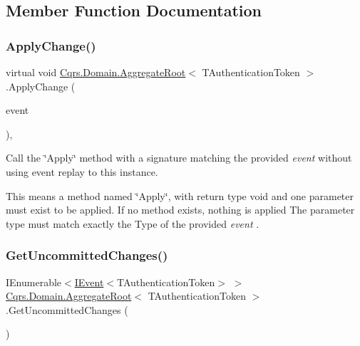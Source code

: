 \subsection{Member Function Documentation}
\mbox{\label{classCqrs_1_1Domain_1_1AggregateRoot_a7e299b13c7556731e52670aa6d782296_a7e299b13c7556731e52670aa6d782296}} 
\subsubsection{\texorpdfstring{Apply\+Change()}{ApplyChange()}}
{\footnotesize\ttfamily virtual void \hyperlink{classCqrs_1_1Domain_1_1AggregateRoot}{Cqrs.\+Domain.\+Aggregate\+Root}$<$ T\+Authentication\+Token $>$.Apply\+Change (\begin{DoxyParamCaption}\item[{\hyperlink{interfaceCqrs_1_1Events_1_1IEvent}{I\+Event}$<$ T\+Authentication\+Token $>$ @}]{event }\end{DoxyParamCaption})\hspace{0.3cm}{\ttfamily [protected]}, {\ttfamily [virtual]}}



Call the \char`\"{}\+Apply\char`\"{} method with a signature matching the provided {\itshape event}  without using event replay to this instance. 

This means a method named \char`\"{}\+Apply\char`\"{}, with return type void and one parameter must exist to be applied. If no method exists, nothing is applied The parameter type must match exactly the Type of the provided {\itshape event} . \mbox{\label{classCqrs_1_1Domain_1_1AggregateRoot_a625e885ec7885a686f729ed1efe3a8fa_a625e885ec7885a686f729ed1efe3a8fa}} 
\subsubsection{\texorpdfstring{Get\+Uncommitted\+Changes()}{GetUncommittedChanges()}}
{\footnotesize\ttfamily I\+Enumerable$<$\hyperlink{interfaceCqrs_1_1Events_1_1IEvent}{I\+Event}$<$T\+Authentication\+Token$>$ $>$ \hyperlink{classCqrs_1_1Domain_1_1AggregateRoot}{Cqrs.\+Domain.\+Aggregate\+Root}$<$ T\+Authentication\+Token $>$.Get\+Uncommitted\+Changes (\begin{DoxyParamCaption}{ }\end{DoxyParamCaption})}



